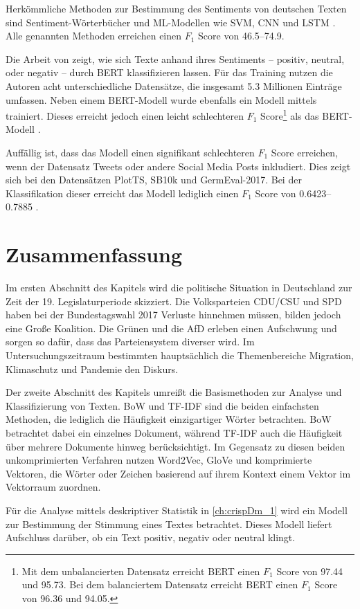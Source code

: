 Herkömmliche Methoden zur Bestimmung des Sentiments von deutschen Texten sind Sentiment-Wörterbücher und \ac{ML}-Modellen wie \ac{SVM}, \ac{CNN} und \ac{LSTM} \autocite[1627\psq]{guhr_training_2020}. Alle genannten Methoden erreichen einen $F_1$ Score von \numrange{46.5}{74.9}.

Die Arbeit von \textcite{guhr_training_2020} zeigt, wie sich Texte anhand ihres Sentiments -- positiv, neutral, oder negativ -- durch \ac{BERT} klassifizieren lassen. Für das Training nutzen die Autoren acht unterschiedliche Datensätze, die insgesamt \num{5.3} Millionen Einträge umfassen. Neben einem \ac{BERT}-Modell wurde ebenfalls ein Modell mittels \ft trainiert. Dieses erreicht jedoch einen leicht schlechteren $F_1$ Score\footnote{Mit dem unbalancierten Datensatz erreicht \ac{BERT} einen $F_1$ Score von \num{97.44} und \ft \num{95.73}. Bei dem balanciertem Datensatz erreicht \ac{BERT} einen $F_1$ Score von \num{96.36} und \ft \num{94.05}.} als das \ac{BERT}-Modell \autocite[]{guhr_training_2020}.

Auffällig ist, dass das Modell einen signifikant schlechteren $F_1$ Score erreichen, wenn der Datensatz Tweets oder andere Social Media Posts inkludiert. Dies zeigt sich bei den Datensätzen PlotTS, SB10k und GermEval-2017. Bei der Klassifikation dieser erreicht das Modell lediglich einen $F_1$ Score von \numrange{0.6423}{0.7885} \autocite[1631]{guhr_training_2020}.

\section{Zusammenfassung}

Im ersten Abschnitt des Kapitels wird die politische Situation in Deutschland zur Zeit der \num{19}. Legislaturperiode skizziert. Die Volksparteien \ac{CDU}/\ac{CSU} und \ac{SPD} haben bei der Bundestagswahl \num{2017} Verluste hinnehmen müssen, bilden jedoch eine Große Koalition. Die Grünen und die \ac{AfD} erleben einen Aufschwung und sorgen so dafür, dass das Parteiensystem diverser wird. Im Untersuchungszeitraum bestimmten hauptsächlich die Themenbereiche Migration, Klimaschutz und Pandemie den Diskurs.

Der zweite Abschnitt des Kapitels umreißt die Basismethoden zur Analyse und Klassifizierung von Texten. \ac{BoW} und \ac{TF-IDF} sind die beiden einfachsten Methoden, die lediglich die Häufigkeit einzigartiger Wörter betrachten. \ac{BoW} betrachtet dabei ein einzelnes Dokument, während \ac{TF-IDF} auch die Häufigkeit über mehrere Dokumente hinweg berücksichtigt. Im Gegensatz zu diesen beiden unkomprimierten Verfahren nutzen Word2Vec, GloVe und \ft komprimierte Vektoren, die Wörter oder Zeichen basierend auf ihrem Kontext einem Vektor im Vektorraum zuordnen.

Für die Analyse mittels deskriptiver Statistik in \autoref{ch:crispDm_1} wird ein Modell zur Bestimmung der Stimmung eines Textes betrachtet. Dieses Modell liefert Aufschluss darüber, ob ein Text positiv, negativ oder neutral klingt.
